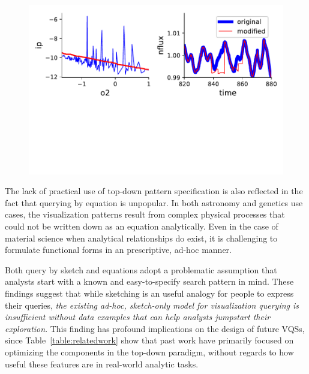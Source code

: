 \begin{figure}[h!]
    \centering
    \includegraphics[width=\columnwidth]{figures/QueryModificationBySketch.pdf}
    \caption{
    \label{query_modification}}
    \vspace{-10pt}
\end{figure}
\par The lack of practical use of top-down pattern specification is also reflected in the fact that querying by equation is unpopular. In both astronomy and genetics use cases, the visualization patterns result from complex physical processes that could not be written down as an equation analytically. Even in the case of material science when analytical relationships do exist, it is challenging to formulate functional forms in an prescriptive, ad-hoc manner.
\par Both query by sketch and equations adopt a problematic assumption that analysts start with a known and easy-to-specify search pattern in mind. These findings suggest that while sketching is an useful analogy for people to express their queries, \emph{the existing ad-hoc, sketch-only model for visualization querying is insufficient without data examples that can help analysts jumpstart their exploration}. This finding has profound implications on the design of future VQSs, since Table~\ref{table:relatedwork} show that past work have primarily focused on optimizing the components in the top-down paradigm, without regards to how useful these features are in real-world analytic tasks.
